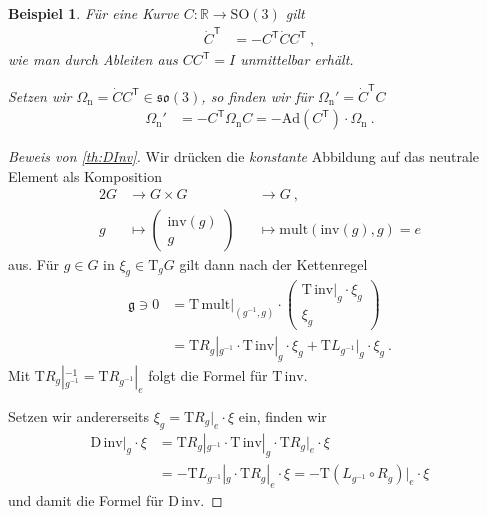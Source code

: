 \documentclass[10pt,a4paper]{article}
\theoremstyle{mytheorem}
\theoremstyle{mydefinition}
\newtheorem{example}[theorem]{Beispiel}
\newcommand{\trans}{^\mathsf{T}}
\newcommand{\Dt}{\mathrm{D}}
\newcommand{\Tt}{\mathrm{T}}
\newcommand{\Ad}{\mathrm{Ad}}
\newcommand{\SO}{\mathrm{SO}}
\newcommand{\fso}{\mathfrak{so}}
\newcommand{\nav}{\mathrm{n}}
\begin{document}
\begin{example}
Für eine Kurve $C:\mathbb{R}\rightarrow\SO(3)$ gilt
\begin{align*}
	\dot{C}\trans &= -C\trans\dot{C}C\trans
	\ ,
\end{align*}
wie man durch Ableiten aus $CC\trans=I$ unmittelbar erhält.

Setzen wir $\Omega_\nav=\dot{C}C\trans\in\fso(3)$, so finden wir für $\Omega_\nav'=\dot{C}\trans C$
\begin{align*}
	\Omega_\nav' &= -C\trans\Omega_\nav C = -\Ad(C\trans)\cdot \Omega_\nav
	\ .
\end{align*}
\end{example}

\begin{proof}[Beweis von \ref{th:DInv}]
Wir drücken die \emph{konstante} Abbildung auf das neutrale Element als Komposition
\begin{alignat*}{2}
	G 
	&\rightarrow G\times G 
	&&\rightarrow G
	\ ,\nonumber\\
	g 
	&\mapsto
	\begin{pmatrix}
		\mathrm{inv}(g) \\ g
	\end{pmatrix}
	&&\mapsto \mathrm{mult}(\mathrm{inv}(g), g) = e
\end{alignat*}
aus.
Für $g\in G$ in $\xi_g\in\Tt_gG$ gilt dann nach der Kettenregel
\begin{align*}
	\mathfrak{g}\ni	
	0 &= 
	\Tt\,\mathrm{mult}|_{(g^{-1},g)}
	\cdot
	\begin{pmatrix}
		\Tt\,\mathrm{inv}|_{g} \cdot \xi_g \\
		\xi_g
	\end{pmatrix}
	\nonumber\\
	&= 
	\Tt R_g|_{g^{-1}}\cdot \Tt\,\mathrm{inv}|_{g} \cdot \xi_g
	+ \Tt L_{g^{-1}}|_g\cdot \xi_g
	\ .
\end{align*}
Mit $\Tt R_g|_{g^{-1}}^{-1}=\Tt R_{g^{-1}}|_{e}$ folgt die Formel für $\Tt\,\mathrm{inv}$.

Setzen wir andererseits $\xi_g=\Tt R_g|_e\cdot \xi$ ein, finden wir
\begin{align*}
	\Dt\,\mathrm{inv}|_{g} \cdot \xi
	&= \Tt R_g|_{g^{-1}}
	\cdot \Tt\,\mathrm{inv}|_{g}
	\cdot \Tt R_g|_e\cdot \xi
	\nonumber\\
	&= -\Tt L_{g^{-1}}|_g\cdot \Tt R_g|_e \cdot \xi
	= -\Tt (L_{g^{-1}}\circ R_g)|_e \cdot \xi
\end{align*}
und damit die Formel für $\Dt\,\mathrm{inv}$.
\end{proof}
\end{document}
